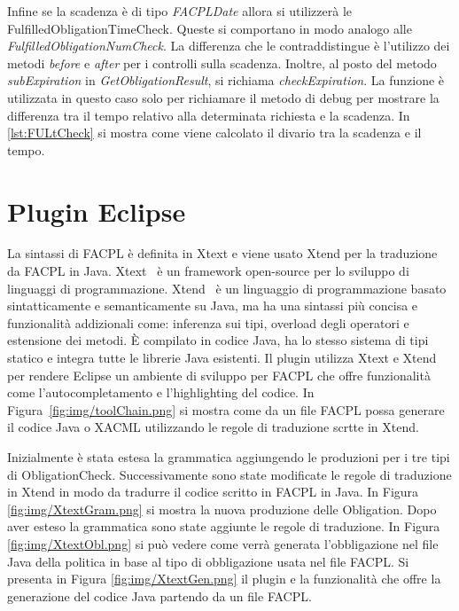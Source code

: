 Infine se la scadenza è di tipo \emph{FACPLDate} allora si utilizzerà le FulfilledObligationTimeCheck.
Queste si comportano in modo analogo alle \emph{FulfilledObligationNumCheck}. La differenza che le contraddistingue è
l'utilizzo dei metodi \emph{before} e \emph{after} per i controlli sulla scadenza.
Inoltre, al posto del metodo \emph{subExpiration} in \emph{GetObligationResult}, si richiama \emph{checkExpiration}.
La funzione è utilizzata in questo caso solo per richiamare il metodo di debug per mostrare
la differenza tra il tempo relativo alla determinata richiesta e la scadenza. In \ref{lst:FULtCheck} si
mostra come viene calcolato il divario tra la scadenza e il tempo.
\section{Plugin Eclipse}
\label{sec:Plugin Eclipse}
La sintassi di FACPL è definita in Xtext e viene usato Xtend per la traduzione da \ac{FACPL} in Java.
Xtext~\cite{xtext} è un framework open-source per lo sviluppo di linguaggi di programmazione.
Xtend~\cite{xtend} è un linguaggio di programmazione basato sintatticamente e semanticamente su Java, ma
ha una sintassi più concisa e funzionalità addizionali come: inferenza sui tipi, overload degli operatori e estensione dei metodi.
\MakeUppercase{è} compilato in codice Java, ha lo stesso sistema di tipi statico e integra tutte le librerie Java esistenti.
Il plugin utilizza Xtext e Xtend per rendere Eclipse un ambiente di sviluppo per \ac{FACPL} che offre funzionalità
come l'autocompletamento e l'highlighting del codice. In Figura~\ref{fig:img/toolChain.png} si mostra come da un file FACPL
possa generare il codice Java o XACML utilizzando le regole di traduzione scrtte in Xtend.\par
{}
Inizialmente è stata estesa la grammatica aggiungendo le produzioni per i tre tipi di ObligationCheck.
Successivamente sono state modificate le regole di traduzione in Xtend in modo da tradurre il codice scritto in FACPL in Java.
In Figura \ref{fig:img/XtextGram.png} si mostra la nuova produzione delle Obligation.
Dopo aver esteso la grammatica sono state aggiunte le regole di traduzione. In Figura \ref{fig:img/XtextObl.png} si può
vedere come verrà generata l'obbligazione nel file Java della politica in base al tipo di obbligazione usata nel file \ac{FACPL}.
Si presenta in Figura \ref{fig:img/XtextGen.png} il plugin e la funzionalità che offre la generazione del codice Java
partendo da un file \ac{FACPL}.
